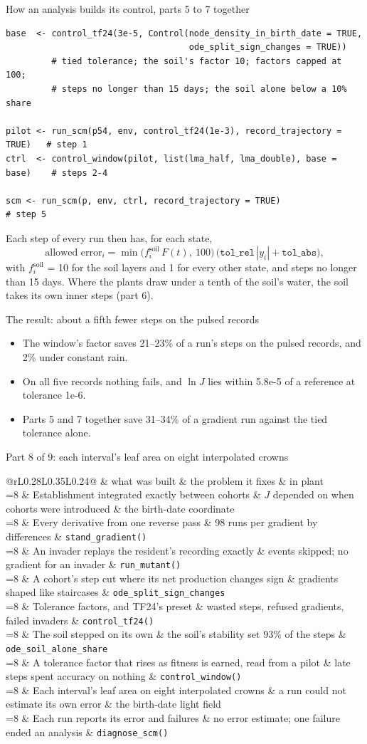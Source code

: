 \documentclass[aspectratio=169,10pt]{beamer}
\makeatletter
\newcommand{\rmrow}[4]{%
  \ifnum#1=\rmcurrent \rowcolor{wash}\fi
  #1 & #2 & #3 & #4 \\}
\newcommand{\roadmap}[1]{%
  \def\rmcurrent{#1}%
  \footnotesize
  \begin{tabular}{@{}rL{0.28\textwidth}L{0.35\textwidth}L{0.24\textwidth}@{}}
    \toprule
    & what was built & the problem it fixes & in plant \\
    \midrule
    \rmrow{1}{Establishment integrated exactly between cohorts}{$J$ depended on when cohorts were introduced}{the birth-date coordinate}
    \rmrow{2}{Every derivative from one reverse pass}{98 runs per gradient by differences}{\texttt{stand\_gradient()}}
    \rmrow{3}{An invader replays the resident's recording exactly}{events skipped; no gradient for an invader}{\texttt{run\_mutant()}}
    \rmrow{4}{A cohort's step cut where its net production changes sign}{gradients shaped like staircases}{\texttt{ode\_split\_sign\_changes}}
    \rmrow{5}{Tolerance factors, and TF24's preset}{wasted steps, refused gradients, failed invaders}{\texttt{control\_tf24()}}
    \rmrow{6}{The soil stepped on its own}{the soil's stability set 93\% of the steps}{\texttt{ode\_soil\_alone\_share}}
    \rmrow{7}{A tolerance factor that rises as fitness is earned, read from a pilot}{late steps spent accuracy on nothing}{\texttt{control\_window()}}
    \rmrow{8}{Each interval's leaf area on eight interpolated crowns}{a run could not estimate its own error}{the birth-date light field}
    \rmrow{9}{Each run reports its error and failures}{no error estimate; one failure ended an analysis}{\texttt{diagnose\_scm()}}
    \bottomrule
  \end{tabular}}
\makeatother
\begin{document}
\begin{frame}[fragile]{How an analysis builds its control, parts 5 to 7 together}
  \begin{lstlisting}
base  <- control_tf24(3e-5, Control(node_density_in_birth_date = TRUE,
                                    ode_split_sign_changes = TRUE))
         # tied tolerance; the soil's factor 10; factors capped at 100;
         # steps no longer than 15 days; the soil alone below a 10% share

pilot <- run_scm(p54, env, control_tf24(1e-3), record_trajectory = TRUE)   # step 1
ctrl  <- control_window(pilot, list(lma_half, lma_double), base = base)    # steps 2-4

scm <- run_scm(p, env, ctrl, record_trajectory = TRUE)                     # step 5
  \end{lstlisting}
  \small
  Each step of every run then has, for each state,
  \[
    \text{allowed error}_i = \min\big(f^{\text{soil}}_i\,F(t),\ 100\big)\,
      \big(\texttt{tol\_rel}\,|y_i| + \texttt{tol\_abs}\big),
  \]
  with $f^{\text{soil}}_i$ = 10 for the soil layers and 1 for every other state, and steps no
  longer than 15 days. Where the plants draw under a tenth of the soil's water, the soil takes
  its own inner steps (part 6).
\end{frame}

\begin{frame}{The result: about a fifth fewer steps on the pulsed records}
  \small
  \begin{itemize}
    \item The window's factor saves 21--23\% of a run's steps on the pulsed records, and 2\%
      under constant rain.
    \item On all five records nothing fails, and $\ln J$ lies within 5.8e-5 of a reference at
      tolerance 1e-6.
    \item Parts 5 and 7 together save 31--34\% of a gradient run against the tied tolerance
      alone.
  \end{itemize}
\end{frame}

\begin{frame}{Part 8 of 9: each interval's leaf area on eight interpolated crowns}
  \roadmap{8}
\end{frame}
\end{document}
